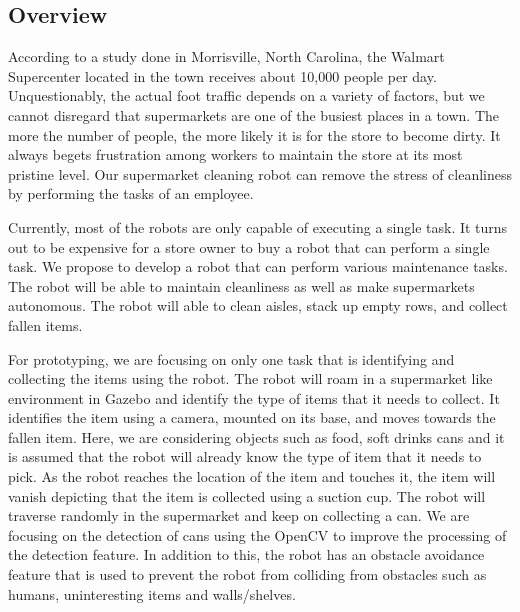 \href{https://travis-ci.org/urastogi885/Supermarket-Cleaning-Robot}{\tt } \href{https://coveralls.io/github/urastogi885/Supermarket-Cleaning-Robot?branch=master}{\tt } \subsection*{\href{https://github.com/urastogi885/Supermarket-Cleaning-Robot/blob/master/LICENSE}{\tt } }

\subsection*{Overview}

According to a study done in Morrisville, North Carolina, the Walmart Supercenter located in the town receives about 10,000 people per day. Unquestionably, the actual foot traffic depends on a variety of factors, but we cannot disregard that supermarkets are one of the busiest places in a town. The more the number of people, the more likely it is for the store to become dirty. It always begets frustration among workers to maintain the store at its most pristine level. Our supermarket cleaning robot can remove the stress of cleanliness by performing the tasks of an employee.

Currently, most of the robots are only capable of executing a single task. It turns out to be expensive for a store owner to buy a robot that can perform a single task. We propose to develop a robot that can perform various maintenance tasks. The robot will be able to maintain cleanliness as well as make supermarkets autonomous. The robot will able to clean aisles, stack up empty rows, and collect fallen items.

For prototyping, we are focusing on only one task that is identifying and collecting the items using the robot. The robot will roam in a supermarket like environment in Gazebo and identify the type of items that it needs to collect. It identifies the item using a camera, mounted on its base, and moves towards the fallen item. Here, we are considering objects such as food, soft drinks cans and it is assumed that the robot will already know the type of item that it needs to pick. As the robot reaches the location of the item and touches it, the item will vanish depicting that the item is collected using a suction cup. The robot will traverse randomly in the supermarket and keep on collecting a can. We are focusing on the detection of cans using the Open\+CV to improve the processing of the detection feature. In addition to this, the robot has an obstacle avoidance feature that is used to prevent the robot from colliding from obstacles such as humans, uninteresting items and walls/shelves.

